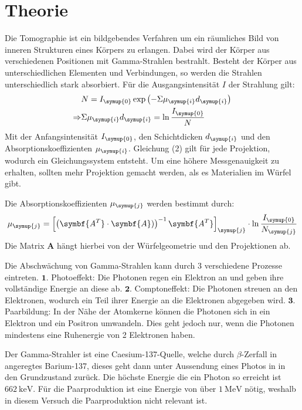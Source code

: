 \section{Theorie}
\label{sec:Theorie}

Die Tomographie ist ein bildgebendes Verfahren um ein räumliches Bild von inneren Strukturen
eines Körpers zu erlangen. Dabei wird der Körper aus verschiedenen Positionen mit
Gamma-Strahlen bestrahlt. Besteht der Körper aus unterschiedlichen Elementen und Verbindungen,
so werden die Strahlen unterschiedlich stark absorbiert. Für die Ausgangsintensität $I$
der Strahlung gilt:
\begin{align}
  &N=I_{\symup{0}} \exp{\left(-\Sigma \mu_{\symup{i}} d_{\symup{i}}\right)} \\
  \Rightarrow &\Sigma \mu_{\symup{i}} d_{\symup{i}} = \ln{\frac{I_{\symup{0}}}{N}}
  \label{eqn:mu}
\end{align}
Mit der Anfangsintensität $I_{\symup{0}}$, den Schichtdicken $d_{\symup{i}}$
und den Absorptionskoeffizienten $\mu_{\symup{i}}$.
Gleichung (2) gilt für jede Projektion, wodurch ein Gleichungssystem entsteht. Um eine höhere
Messgenauigkeit zu erhalten, sollten mehr Projektion gemacht werden, als es
Materialien im Würfel gibt.

Die Absorptionskoeffizienten $\mu_{\symup{j}}$ werden bestimmt durch:
\begin{align}
  \mu_{\symup{j}} = \left[\left(\symbf{A^T} \cdot \symbf{A})\right)^{-1} \symbf{A^T}\right]_{\symup{j}} \cdot \ln{\frac{I_{\symup{0}}}{N_{\symup{j}}}}
\end{align}
Die Matrix $\symbf{A}$ hängt hierbei von der Würfelgeometrie und den Projektionen ab.

Die Abschwächung von Gamma-Strahlen kann durch 3 verschiedene Prozesse eintreten.
$\symbf{1.}$ Photoeffekt: Die Photonen regen ein Elektron an und geben ihre vollständige Energie an diese ab.
$\symbf{2.}$ Comptoneffekt: Die Photonen streuen an den Elektronen, wodurch ein Teil ihrer Energie
an die Elektronen abgegeben wird.
$\symbf{3.}$ Paarbildung: In der Nähe der Atomkerne können die Photonen sich in ein Elektron und ein Positron
umwandeln. Dies geht jedoch nur, wenn die Photonen mindestens eine Ruhenergie von 2 Elektronen
haben.

Der Gamma-Strahler ist eine Caesium-137-Quelle, welche durch $\beta$-Zerfall in angeregtes Barium-137,
dieses geht dann unter Aussendung eines Photos in in den Grundzustand zurück. Die höchste
Energie die ein Photon so erreicht ist $\SI{662}{\kilo\eV}$. Für die Paarproduktion
ist eine Energie von über $\SI{1}{\mega\eV}$ nötig, weshalb in diesem Versuch die
Paarproduktion nicht relevant ist.
